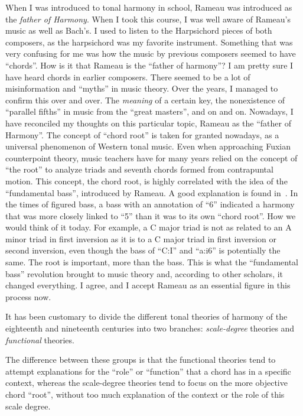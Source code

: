  When I was introduced
to tonal harmony in school, Rameau was introduced as the
\emph{father of Harmony}. When I took this course, I was
well aware of Rameau's music as well as Bach's. I used to
listen to the Harpsichord pieces of both composers, as the
harpsichord was my favorite instrument. Something that was
very confusing for me was how the music by previous
composers seemed to have ``chords''. How is it that Rameau
is the ``father of harmony''? I am pretty sure I have
heard chords in earlier composers. There seemed to be a
lot of misinformation and ``myths'' in music theory. Over
the years, I managed to confirm this over and over. The
\emph{meaning} of a certain key, the nonexistence of
``parallel fifths'' in music from the ``great masters'',
and on and on. Nowadays, I have reconciled my thoughts on
this particular topic, Rameau as the ``father of
Harmony''. The concept of ``chord root'' is taken for
granted nowadays, as a universal phenomenon of Western
tonal music. Even when approaching Fuxian counterpoint
theory, music teachers have for many years relied on the
concept of ``the root'' to analyze triads and seventh
chords formed from contrapuntal motion. This concept, the
chord root, is highly correlated with the idea of the
``fundamental bass'', introduced by Rameau. A good
explanation is found in~\textcite{christensen2002rameau}.
In the times of figured bass, a bass with an annotation of
``6'' indicated a harmony that was more closely linked to
``5'' than it was to its own ``chord root''. How we would
think of it today. For example, a C major triad is not as
related to an A minor triad in first inversion as it is to
a C major triad in first inversion or second inversion,
even though the bass of ``C:I'' and ``a:i6'' is
potentially the same. The root is important, more than the
bass. This is what the ``fundamental bass'' revolution
brought to music theory and, according to other scholars,
it changed everything. I agree, and I accept Rameau as an
essential figure in this process now.


It has been customary to divide the different tonal
theories of harmony of the eighteenth and nineteenth
centuries into two branches: \emph{scale-degree} theories
and \emph{functional} theories.

The difference between these groups is that the functional
theories tend to attempt explanations for the ``role'' or
``function'' that a chord has in a specific context,
whereas the scale-degree theories tend to focus on the
more objective chord ``root'', without too much
explanation of the context or the role of this scale
degree.

